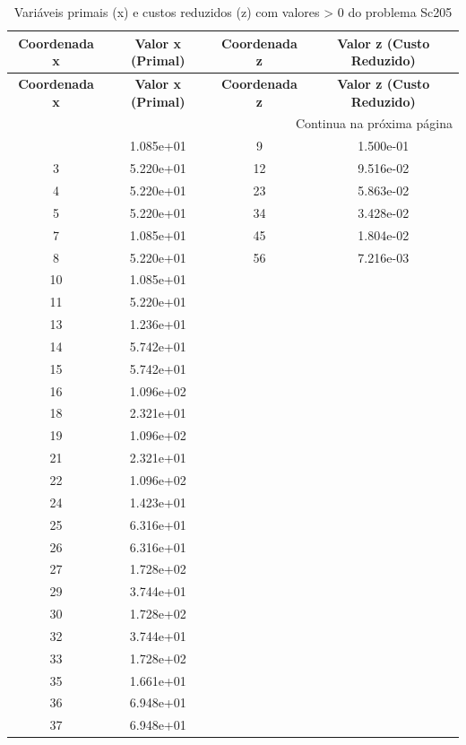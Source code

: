 \documentclass[12pt]{article}
\begin{document}
\begin{longtable}{@{}cccc@{}}
\caption{Variáveis primais (x) e custos reduzidos (z) com valores > 0 do problema Sc205} \\
\toprule
\textbf{Coordenada x} & \textbf{Valor x (Primal)} & \textbf{Coordenada z} & \textbf{Valor z (Custo Reduzido)} \\
\midrule
\endfirsthead

\toprule
\textbf{Coordenada x} & \textbf{Valor x (Primal)} & \textbf{Coordenada z} & \textbf{Valor z (Custo Reduzido)} \\
\midrule
\endhead

\midrule \multicolumn{4}{r}{{Continua na próxima página}} \\ \midrule
\endfoot

\bottomrule
\endlastfoot
2 & 1.085e+01 & 9 & 1.500e-01 \\
3 & 5.220e+01 & 12 & 9.516e-02 \\
4 & 5.220e+01 & 23 & 5.863e-02 \\
5 & 5.220e+01 & 34 & 3.428e-02 \\
7 & 1.085e+01 & 45 & 1.804e-02 \\
8 & 5.220e+01 & 56 & 7.216e-03 \\
10 & 1.085e+01 &  &  \\
11 & 5.220e+01 &  &  \\
13 & 1.236e+01 &  &  \\
14 & 5.742e+01 &  &  \\
15 & 5.742e+01 &  &  \\
16 & 1.096e+02 &  &  \\
18 & 2.321e+01 &  &  \\
19 & 1.096e+02 &  &  \\
21 & 2.321e+01 &  &  \\
22 & 1.096e+02 &  &  \\
24 & 1.423e+01 &  &  \\
25 & 6.316e+01 &  &  \\
26 & 6.316e+01 &  &  \\
27 & 1.728e+02 &  &  \\
29 & 3.744e+01 &  &  \\
30 & 1.728e+02 &  &  \\
32 & 3.744e+01 &  &  \\
33 & 1.728e+02 &  &  \\
35 & 1.661e+01 &  &  \\
36 & 6.948e+01 &  &  \\
37 & 6.948e+01 &  &  \\

\end{longtable}
\end{document}
